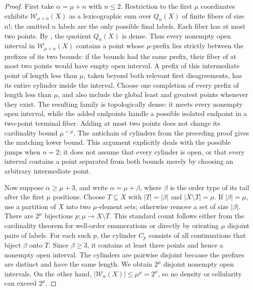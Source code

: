 \documentclass[11pt]{article}
\theoremstyle{definition}
\theoremstyle{remark}
\newcommand{\WO}{\mathcal W}
\begin{document}
\begin{proof}
First take $\alpha=\mu+n$ with $n\leq2$.  Restriction to the first
$\mu$ coordinates exhibits $\WO_{\mu+n}(X)$ as a lexicographic
sum over $Q_n(X)$ of finite fibers of size $n!$; the omitted $n$ labels
are the only possible final labels.  Each fiber has at most two points.
By , the quotient $Q_n(X)$ is
dense.  Thus every nonempty open interval in
$\WO_{\mu+n}(X)$ contains a point whose $\mu$-prefix lies
strictly between the prefixes of its two bounds: if the bounds had
the same prefix, their fiber of at most two points would have empty
open interval.  A prefix of this intermediate point of length less
than $\mu$, taken beyond both relevant first disagreements, has its
entire cylinder inside the interval.  Choose one completion of every
prefix of length less than $\mu$, and also include the global least
and greatest points whenever they exist.  The resulting family is
topologically dense: it meets every nonempty open interval, while
the added endpoints handle a possible isolated endpoint in a two-point
terminal fiber.  Adding at most two points does not change its
cardinality bound $\mu^{<\mu}$.  The antichain of cylinders from the
preceding proof gives the matching lower bound.  This argument
explicitly deals with the possible jumps
when $n=2$; it does not assume that every cylinder is open, or that
every interval contains a point separated from both bounds merely by
choosing an arbitrary intermediate point.

Now suppose $\alpha\geq\mu+3$, and write $\alpha=\mu+\beta$, where
$\beta$ is the order type of its tail after the first $\mu$ positions.
Choose $T\subseteq X$ with $|T|=|\beta|$ and
$|X\setminus T|=\mu$.  If $|\beta|=\mu$, use a partition of $X$ into
two $\mu$-element sets; otherwise remove a set of size $|\beta|$.
There are $2^\mu$ bijections $p:\mu\to X\setminus T$.  This standard
count follows either from the cardinality theorem for well-order
enumerations or directly by orienting $\mu$ disjoint pairs of labels.
For each such $p$, the cylinder $C_p$ consists of all continuations
that biject $\beta$ onto $T$.  Since $\beta\geq3$, it contains at least
three points and hence a nonempty open interval.  The cylinders are
pairwise disjoint because the prefixes are distinct and have the same
length.  We obtain $2^\mu$ disjoint nonempty open intervals.  On the
other hand, $|\WO_\alpha(X)|\leq\mu^\mu=2^\mu$, so no density
or cellularity can exceed $2^\mu$.
\end{proof}
\end{document}
